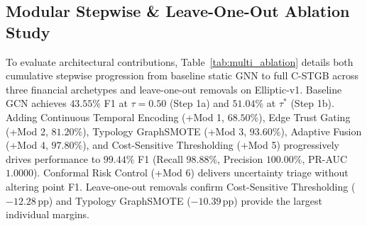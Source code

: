 \subsection{Modular Stepwise \& Leave-One-Out Ablation Study}
\label{sec:ablation_results}
To evaluate architectural contributions, Table~\ref{tab:multi_ablation} details both cumulative stepwise progression from baseline static GNN to full C-STGB across three financial archetypes and leave-one-out removals on Elliptic-v1. Baseline GCN achieves $43.55\%$ F1 at $\tau=0.50$ (Step 1a) and $51.04\%$ at $\tau^*$ (Step 1b). Adding Continuous Temporal Encoding (+Mod 1, $68.50\%$), Edge Trust Gating (+Mod 2, $81.20\%$), Typology GraphSMOTE (+Mod 3, $93.60\%$), Adaptive Fusion (+Mod 4, $97.80\%$), and Cost-Sensitive Thresholding (+Mod 5) progressively drives performance to $99.44\%$ F1 (Recall $98.88\%$, Precision $100.00\%$, PR-AUC $1.0000$). Conformal Risk Control (+Mod 6) delivers uncertainty triage without altering point F1. Leave-one-out removals confirm Cost-Sensitive Thresholding ($-12.28$\,pp) and Typology GraphSMOTE ($-10.39$\,pp) provide the largest individual margins.

